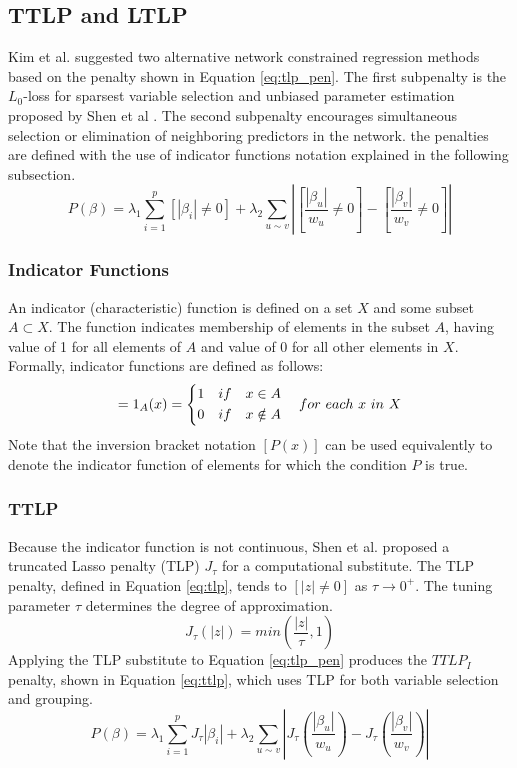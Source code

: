 \subsection{TTLP and LTLP}
Kim et al. \cite{kim2013network} suggested two alternative network constrained regression methods based on the penalty shown in Equation \ref{eq:tlp_pen}. The first subpenalty is the $L_0$-loss for sparsest variable selection and unbiased parameter estimation proposed by Shen et al \cite{shen2012likelihood}. The second subpenalty encourages simultaneous selection or elimination of neighboring predictors in the network. the penalties are defined with the use of indicator functions notation explained in the following subsection.
\begin{equation} \label{eq:tlp_pen}
P(\beta) = \lambda_1 \sum_{i=1}^{p} [|\beta_i|\neq 0] + \lambda_2 \sum_{u \sim v} \left|\left[\frac{|\beta_u|}{w_u}\neq 0\right]-\left[\frac{|\beta_v|}{w_v}\neq 0\right]\right|
\end{equation}

\subsubsection{Indicator Functions}
An indicator (characteristic) function is defined on a set $X$ and some subset $A \subset X$. The function indicates membership of elements in the subset $A$, having value of 1 for all elements of $A$ and value of 0 for all other elements in $X$. Formally, indicator functions are defined as follows:
\begin{equation}
[x \in A] = 1_A (x) = \left\{ 
\begin{aligned} 
1 & \quad if \quad x \in A \cr 
0 & \quad if \quad x \notin A
\end{aligned} \right.
for\ each\ x\ in\ X
\end{equation}
Note that the inversion bracket notation $[P(x)]$ can be used equivalently to denote the indicator function of elements for which the condition $P$ is true.

\subsubsection{TTLP} \label{sec:ttlp}
Because the indicator function is not continuous, Shen et al. \cite{shen2012likelihood} proposed a truncated Lasso penalty (TLP) $J_\tau$ for a computational substitute. The TLP penalty, defined in Equation \ref{eq:tlp}, tends to $[|z|\neq 0]$ as $\tau \to 0^+$. The tuning parameter $\tau$ determines the degree of approximation.
\begin{equation} \label{eq:tlp}
J_\tau(|z|)=min\left(\frac{|z|}{\tau},1\right)
\end{equation}
Applying the TLP substitute to Equation \ref{eq:tlp_pen} produces the $TTLP_I$ penalty, shown in Equation \ref{eq:ttlp}, which uses TLP for both variable selection and grouping.
\begin{equation} \label{eq:ttlp}
P(\beta) = \lambda_1 \sum_{i=1}^{p} J_\tau|\beta_i| + \lambda_2 \sum_{u \sim v} \left|J_\tau\left(\frac{|\beta_u|}{w_u}\right)-J_\tau\left(\frac{|\beta_v|}{w_v}\right)\right|
\end{equation}


